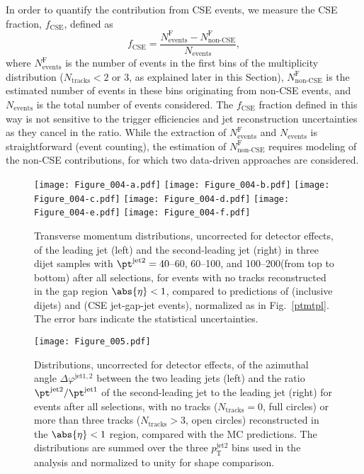 \documentclass[11pt,twoside,a4paper,cmspaper,final,collab]{cms-tdr}
\begin{document}
In order to quantify the contribution from CSE events, we measure the CSE fraction, $f_\mathrm{CSE}$, defined as
\begin{equation}
f_\mathrm{CSE}=\frac{N_\text{events}^\mathrm{F}-N_\text{non-CSE}^\mathrm{F}}{N_\text{events}},
\label{eq-1}
\end{equation}
where $N_\text{events}^\mathrm{F}$ is the number of events in the first bins of the multiplicity distribution ($N_\text{tracks}<2$ or 3, as explained later in this Section), $N_\text{non-CSE}^\mathrm{F}$ is the estimated number of events in these bins originating from non-CSE events, and $N_\text{events}$ is the total number of events considered. The $f_\mathrm{CSE}$ fraction defined in this way is not sensitive to the trigger efficiencies and jet reconstruction uncertainties as they cancel in the ratio. While the extraction of $N_\text{events}^\mathrm{F}$ and $N_\text{events}$ is straightforward (event counting), the estimation of $N_\text{non-CSE}^\mathrm{F}$ requires modeling of the non-CSE contributions, for which two data-driven approaches are considered.

\begin{figure*}[htbp]
\centering
\texttt{[image: Figure\_004-a.pdf]}
\texttt{[image: Figure\_004-b.pdf]}
\texttt{[image: Figure\_004-c.pdf]}
\texttt{[image: Figure\_004-d.pdf]}
\texttt{[image: Figure\_004-e.pdf]}
\texttt{[image: Figure\_004-f.pdf]}
\caption{Transverse momentum distributions, uncorrected for detector effects, of the leading jet (left) and the second-leading jet (right) in three dijet samples with $\pt^\text{jet2} = 40$--60, 60--100, and 100--200\GeV (from top to bottom) after all selections, for events with no tracks reconstructed in the gap region $\abs{\eta}<1$, compared to predictions of  (inclusive dijets) and  (CSE jet-gap-jet events), normalized as in Fig.~\ref{ptmtpl}. The error bars indicate the statistical uncertainties.}
\label{ptj12}
\end{figure*}


\begin{figure*}[t!]
\centering
\texttt{[image: Figure\_005.pdf]}
\caption{Distributions, uncorrected for detector effects, of the azimuthal angle $\Delta \varphi^\mathrm{jet1,2}$ between the two leading jets (left) and the ratio $\pt^\text{jet2}/\pt^\mathrm{jet1}$  of the second-leading jet \pt to the leading jet \pt (right) for events after all selections, with no tracks ($N_\text{tracks} = 0$, full circles) or more than three tracks ($N_\text{tracks}> 3$,  open circles) reconstructed in the $\abs{\eta}<1$ region, compared with the MC predictions. The distributions are summed over the three $p^\text{jet2}_\mathrm{T}$ bins used in the analysis and normalized to unity for shape comparison.}
\label{dphir}
\end{figure*}
\end{document}
